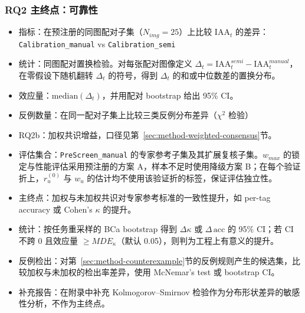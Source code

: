 \subsubsection{RQ2 主终点：可靠性}
\begin{itemize}
    \item 指标：在预注册的同图配对子集（$N_{img}=25$）上比较 $\mathrm{IAA}_t$ 的差异：\texttt{Calibration\_manual} vs \texttt{Calibration\_semi}
    \item 统计：同图配对置换检验。对每张配对图像定义 $\Delta_t=\mathrm{IAA}_t^{semi}-\mathrm{IAA}_t^{manual}$，在零假设下随机翻转 $\Delta_t$ 的符号，得到 $\Delta_t$ 的和或中位数差的置换分布。
    \item 效应量：$\mathrm{median}(\Delta_t)$，并用配对 bootstrap 给出 95\% CI。
    \item 反例数量：在同一配对子集上比较三类反例分布差异（$\chi^2$ 检验）
    \item RQ2b：加权共识增益，口径见第~\ref{sec:method-weighted-consensus}节。
    \item 评估集合：\texttt{PreScreen\_manual} 的专家参考子集及其扩展复核子集。$w_{max}$ 的锁定与性能评估采用预注册的方案 A，样本不足时使用降级方案 B；在每个验证折上，$r_u^{(0)}$ 与 $w_u$ 的估计均不使用该验证折的标签，保证评估独立性。
    \item 主终点：加权与未加权共识对专家参考标准的一致性提升，如 per-tag accuracy 或 Cohen's $\kappa$ 的提升。
    \item 统计：按任务重采样的 BCa bootstrap 得到 $\Delta\kappa$ 或 $\Delta\,\mathrm{acc}$ 的 95\% CI；若 CI 不跨 0 且效应量 $\geq MDE_\kappa$（默认 0.05），则判为工程上有意义的提升。
    \item 反例检出：对第~\ref{sec:method-counterexample}节的反例规则产生的候选集，比较加权与未加权的检出率差异，使用 McNemar's test 或 bootstrap CI。
    \item 补充报告：在附录中补充 Kolmogorov--Smirnov 检验作为分布形状差异的敏感性分析，不作为主终点。
\end{itemize}
